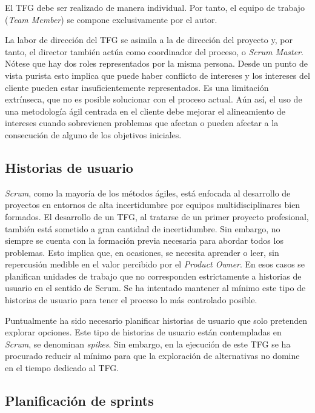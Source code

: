 El TFG debe ser realizado de manera individual.  Por tanto, el equipo de trabajo (\emph{Team Member}) se compone exclusivamente por el autor.

La labor de dirección del TFG se asimila a la de dirección del proyecto y, por tanto, el director también actúa como coordinador del proceso, o \emph{Scrum Master}.  Nótese que hay dos roles representados por la misma persona.  Desde un punto de vista purista esto implica que puede haber conflicto de intereses y los intereses del cliente pueden estar insuficientemente representados.  Es una limitación extrínseca, que no es posible solucionar con el proceso actual.  Aún así, el uso de una metodología ágil centrada en el cliente debe mejorar el alineamiento de intereses cuando sobrevienen problemas que afectan o pueden afectar a la consecución de alguno de los objetivos iniciales.

\subsection{Historias de usuario}

\emph{Scrum}, como la mayoría de los métodos ágiles, está enfocada al desarrollo de proyectos en entornos de alta incertidumbre por equipos multidisciplinares bien formados.  El desarrollo de un TFG, al tratarse de un primer proyecto profesional, también está sometido a gran cantidad de incertidumbre.  Sin embargo, no siempre se cuenta con la formación previa necesaria para abordar todos los problemas.  Esto implica que, en ocasiones, se necesita aprender o leer, sin repercusión medible en el valor percibido por el \emph{Product Owner}.  En esos casos se planifican unidades de trabajo que no corresponden estrictamente a historias de usuario en el sentido de Scrum.  Se ha intentado mantener al mínimo este tipo de historias de usuario para tener el proceso lo más controlado posible.

Puntualmente ha sido necesario planificar historias de usuario que solo pretenden explorar opciones.  Este tipo de historias de usuario están contempladas en \emph{Scrum}, se denominan \emph{spikes}.  Sin embargo, en la ejecución de este TFG se ha procurado reducir al mínimo para que la exploración de alternativas no domine en el tiempo dedicado al TFG.

\subsection{Planificación de sprints}

